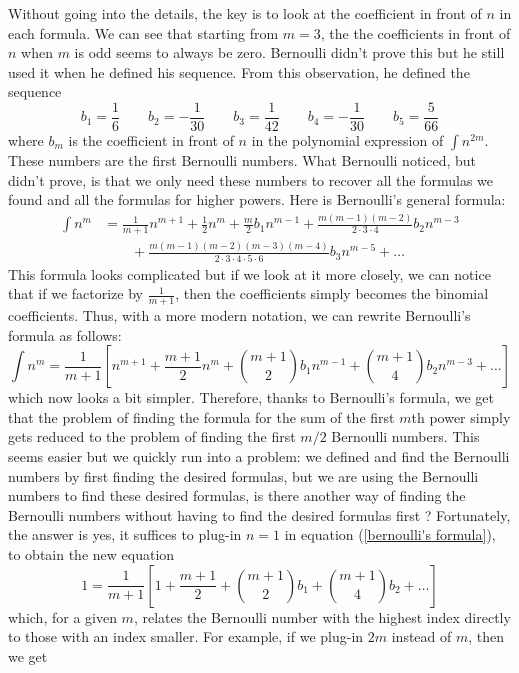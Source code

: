 Without going into the details, the key is to look at the coefficient in front of $n$ in each formula. We can see that starting from $m=3$, the the coefficients in front of $n$ when $m$ is odd seems to always be zero. Bernoulli didn't prove this but he still used it when he defined his sequence. From this observation, he defined the sequence
$$b_1 = \frac{1}{6} \qquad b_2 = -\frac{1}{30} \qquad b_3=\frac{1}{42} \qquad b_4 = -\frac{1}{30} \qquad b_5 = \frac{5}{66}$$
where $b_m$ is the coefficient in front of $n$ in the polynomial expression of $\int n^{2m}$. These numbers are the first Bernoulli numbers. What Bernoulli noticed, but didn't prove, is that we only need these numbers to recover all the formulas we found and all the formulas for higher powers. Here is Bernoulli's general formula:
\begin{align*}
    \int n^m &= \frac{1}{m+1}n^{m+1} + \frac{1}{2}n^m + \frac{m}{2}b_1 n^{m-1} + \frac{m(m-1)(m-2)}{2\cdot 3 \cdot 4}b_2 n^{m-3} \\
    & \qquad + \frac{m(m-1)(m-2)(m-3)(m-4)}{2\cdot 3 \cdot 4 \cdot 5 \cdot 6}b_3 n^{m-5} + \dots
\end{align*}
This formula looks complicated but if we look at it more closely, we can notice that if we factorize by $\frac{1}{m+1}$, then the coefficients simply becomes the binomial coefficients. Thus, with a more modern notation, we can rewrite Bernoulli's formula as follows:
\begin{equation} \label{bernoulli's formula}
    \int n^m = \frac{1}{m+1}\left[n^{m+1} + \frac{m+1}{2}n^m + \binom{m+1}{2}b_1n^{m-1} + \binom{m+1}{4}b_2n^{m-3}+ \dots\right]
\end{equation}
which now looks a bit simpler. Therefore, thanks to Bernoulli's formula, we get that the problem of finding the formula for the sum of the first $m$th power simply gets reduced to the problem of finding the first $m/2$ Bernoulli numbers. This seems easier but we quickly run into a problem: we defined and find the Bernoulli numbers by first finding the desired formulas, but we are using the Bernoulli numbers to find these desired formulas, is there another way of finding the Bernoulli numbers without having to find the desired formulas first ? Fortunately, the answer is yes, it suffices to plug-in $n = 1$ in equation (\ref{bernoulli's formula}), to obtain the new equation
$$1 = \frac{1}{m+1}\left[1 + \frac{m+1}{2} + \binom{m+1}{2}b_1 + \binom{m+1}{4}b_2 + \dots\right]$$
which, for a given $m$, relates the Bernoulli number with the highest index directly to those with an index smaller. For example, if we plug-in $2m$ instead of $m$, then we get
